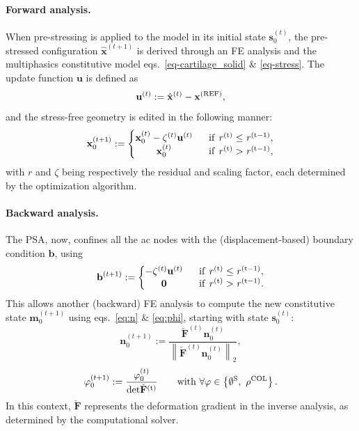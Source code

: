 \documentclass[12pt,a4paper]{report}
\begin{document}
\paragraph{Forward analysis.} When pre-stressing is applied to the model in its initial state $\mathbf{s}^{(t)}_0$, the pre-stressed configuration $\hat{\mathbf{x}}^{(t+1)}$ is derived through an FE analysis and the multiphasics constitutive model eqs.~\ref{eq-cartilage_solid} \& \ref{eq-stress}. The update function $\mathbf{u}$ is defined as
%
\begin{equation}
    \mathbf{u}^{(t)} := \hat{\mathbf{x}}^{(t)}-\mathbf{x}^{\rm{(REF)}},
\end{equation}
%
and the stress-free geometry is edited in the following manner:
%
\begin{equation}
    \mathbf{x}_{0}^{(t+1)} := \left\{\begin{matrix}
    \mathbf{x}_{0}^{(t)} - \zeta^{(t)} \mathbf{u}^{(t)}  & \ \ \rm{if} \ \mathit{r}^{(t)} \leq \mathit{r}^{(t-1)},\\ 
    \mathbf{x}_{0}^{(t)} & \ \ \rm{if} \ \mathit{r}^{(t)} > \mathit{r}^{(t-1)},
    \end{matrix}\right.
\end{equation}
%
with $r$ and $\zeta$ being respectively the residual and scaling factor, each determined by the optimization algorithm.

\paragraph{Backward analysis.} The PSA, now, confines all the \ac{ac} nodes with the (displacement-based) boundary condition $\mathbf{b}$, using
%
\begin{equation}
    \mathbf{b}^{(t+1)} := \left\{\begin{matrix}
     - \zeta^{(t)}\mathbf{u}^{(t)} & \ \ \rm{if} \ \mathit{r}^{(t)} \leq \mathit{r}^{(t-1)},\\ 
    \mathbf{0} & \ \ \rm{if} \ \mathit{r}^{(t)} > \mathit{r}^{(t-1)}.
    \end{matrix}\right.
\end{equation}
%
This allows another (backward) FE analysis to compute the new constitutive state $\mathbf{m}_0^{(t+1)}$ using eqs.~\ref{eq:n} \& \ref{eq:phi}, starting with state $\mathbf{s}_0^{(t)}$:
%
\begin{equation}
    \mathbf{n}_{0}^{(t+1)} := \frac{\check{\mathbf{F}}^{(t)}\mathbf{n}_0^{(t)}}{\left \|\check{\mathbf{F}}^{(t)}\mathbf{n}_0^{(t)} \right \|_2},
\end{equation}
%
\begin{equation}
    \varphi_{0}^{(t+1)} := \frac{\varphi_0^{(t)}}{\rm{det}\check{\mathbf{F}}^{(t)}} 
    \qquad \text{with } \forall \varphi \in \left\{\emptyset^{\rm{S}},\ \rho^{\rm{COL}}\right\}.
\end{equation}
%
In this context, $\check{\mathbf{F}}$ represents the deformation gradient in the inverse analysis, as determined by the computational solver.
\end{document}
